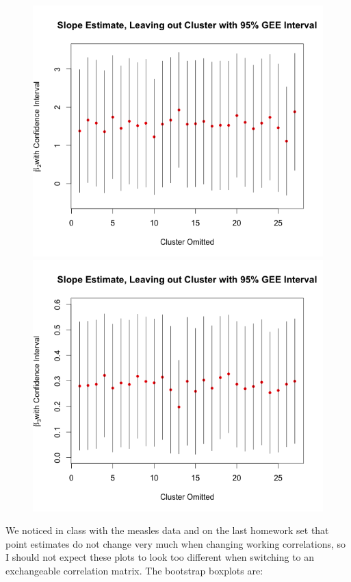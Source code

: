 \documentclass[11pt]{article}
\begin{document}
\begin{enumerate}
\begin{figure}[H]
			\includegraphics[scale=0.4]{RplotDDAR1GEEBeta2.png}
			\includegraphics[scale=0.4]{RplotDDAR1GEEBeta3.png}	
		\end{figure}
		We noticed in class with the measles data and on the last homework set that point estimates do not change very much when changing working correlations, so I should not expect these plots to look too different when switching to an exchangeable correlation matrix. The bootstrap boxplots are:
		\begin{figure}[H]

\end{figure}
\end{enumerate}
\end{document}
